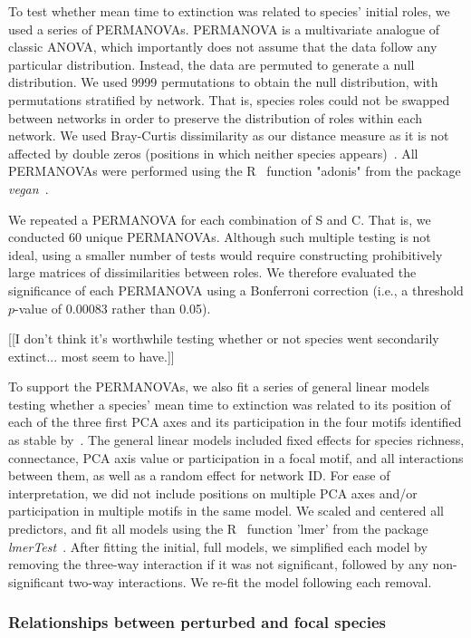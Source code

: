 \documentclass[12pt]{article}
\begin{document}
			To test whether mean time to extinction was related to species' initial roles, we used a series of PERMANOVAs. PERMANOVA is a multivariate analogue of classic ANOVA, which importantly does not assume that the data follow any particular distribution. Instead, the data are permuted to generate a null distribution. We used 9999 permutations to obtain the null distribution, with permutations stratified by network. That is, species roles could not be swapped between networks in order to preserve the distribution of roles within each network. We used Bray-Curtis dissimilarity as our distance measure as it is not affected by double zeros (positions in which neither species appears)~\citep{Baker2015,CirtwillXX,}. All PERMANOVAs were performed using the R~\citep{R} function "adonis" from the package \emph{vegan}~\citep{vegan}. 

			We repeated a PERMANOVA for each combination of S and C. That is, we conducted 60 unique PERMANOVAs. Although such multiple testing is not ideal, using a smaller number of tests would require constructing prohibitively large matrices of dissimilarities between roles. We therefore evaluated the significance of each PERMANOVA using a Bonferroni correction (i.e., a threshold $p$-value of 0.00083 rather than 0.05).

			[[I don't think it's worthwhile testing whether or not species went secondarily extinct... most seem to have.]]


			To support the PERMANOVAs, we also fit a series of general linear models testing whether a species' mean time to extinction was related to its position of each of the three first PCA axes and its participation in the four motifs identified as stable by~\citet{Borrelli}. The general linear models included fixed effects for species richness, connectance, PCA axis value or participation in a focal motif, and all interactions between them, as well as a random effect for network ID. For ease of interpretation, we did not include positions on multiple PCA axes and/or participation in multiple motifs in the same model. We scaled and centered all predictors, and fit all models using the R~\citep{R} function 'lmer' from the package \emph{lmerTest}~\citep{lmerTest}. After fitting the initial, full models, we simplified each model by removing the three-way interaction if it was not significant, followed by any non-significant two-way interactions. We re-fit the model following each removal.


		\subsubsection*{Relationships between perturbed and focal species}
\end{document}
